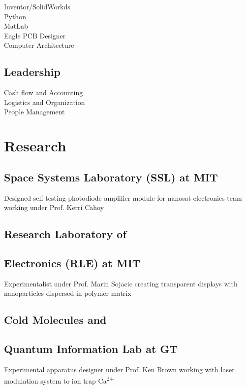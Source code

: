 \documentclass[letterpaper, article]{deedy-resume-openfont}
\begin{document}
\begin{minipage}[t]{0.33\textwidth}
Inventor/SolidWorkds \hspace{.27cm} \textbullet \textbullet  \textbullet \\
Python \hspace{2.5cm} \textbullet \textbullet \textbullet  \textbullet\\
MatLab \hspace{2.42cm} \textbullet \textbullet \textbullet \textbullet  \textbullet\\
Eagle PCB Designer \hspace{.58cm} \textbullet \textbullet \textbullet \textbullet  \textbullet \\
Computer Architecture \hspace{.09cm} \textbullet \textbullet  \textbullet \\
\sectionsep

\subsection{Leadership}
Cash flow and Accounting \hspace{.55cm} \textbullet \textbullet \textbullet  \textbullet\\
Logistics and Organization \hspace{.5cm} \textbullet \textbullet  \textbullet \\
People Management \hspace{1.38cm} \textbullet \textbullet \textbullet \textbullet  \textbullet


\section{Research}
\subsection{Space Systems Laboratory (SSL) at MIT \hfill}
Designed self-testing photodiode amplifier module for nanosat electronics team working under Prof. Kerri Cahoy
\sectionsep
\subsection{Research Laboratory of \hfill}
\subsection{Electronics (RLE) at MIT \hfill}
Experimentalist under Prof. Marin Sojacic creating transparent displays with nanoparticles dispersed in polymer matrix
\sectionsep
\subsection{Cold Molecules and \hfill}
\subsection{Quantum Information \hfill Lab at GT \hfill}
Experimental apparatus designer under Prof. Ken Brown working with laser modulation system to ion trap Ca\textsuperscript{2+}



\end{minipage}
\end{document}

